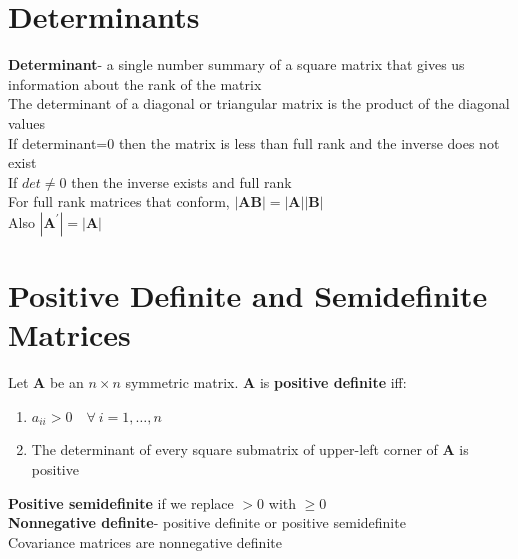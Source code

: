 \documentclass[openany]{book}
\newcommand{\bma}{\bm{A}}
\numberwithin{equation}{section}
\begin{document}
\begin{flushleft}
\section{Determinants}
\textbf{Determinant}- a single number summary of a square matrix that gives us information about the rank of the matrix\\
The determinant of a diagonal or triangular matrix is the product of the diagonal values\\
If determinant=0 then the matrix is less than full rank and the inverse does not exist\\
If $det\neq 0$ then the inverse exists and full rank\\
For full rank matrices that conform, $|\bm{AB}|=|\bma||\bm{B}|$\\
Also $|\bma^{'}|=|\bma|$
\section{Positive Definite and Semidefinite Matrices}
Let $\bma$ be an $n\times n$ symmetric matrix. $\bma$
is \textbf{positive definite} iff:
\begin{enumerate}
\item $a_{ii}>0 \quad \forall \ i=1,\dots,n$
\item The determinant of every square submatrix of upper-left corner of $\bma$ is positive
\end{enumerate}
\textbf{Positive semidefinite} if we replace $>0$ with $\geq 0$\\
\textbf{Nonnegative definite}- positive definite or positive semidefinite\\
Covariance matrices are nonnegative definite\\

\end{flushleft}
\end{document}
